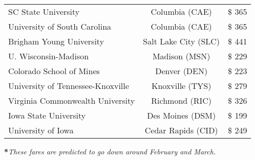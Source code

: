 \begin{center}
\begin{tabular}{lcc}
		SC State University & Columbia (CAE) & $\$$ 365\\
		University of South Carolina & Columbia (CAE) & $\$$ 365\\
		Brigham Young University & Salt Lake City (SLC) & $\$$ 441\\
		U. Wisconsin-Madison & Madison (MSN) & $\$$ 229\\
		Colorado School of Mines & Denver (DEN)& $\$$ 223\\
		University of  Tennessee-Knoxville & Knoxville (TYS) & $\$$ 279\\
		Virginia Commonwealth University & Richmond (RIC) & $\$$ 326 \\
		Iowa State University & Des Moines (DSM) & $\$$ 199 \\
		University of Iowa & Cedar Rapids (CID) & $\$$ 249 \\
	\end{tabular}	
\end{center}
\textbf{*}\textit{These fares are predicted to go down around February and March.}\\

